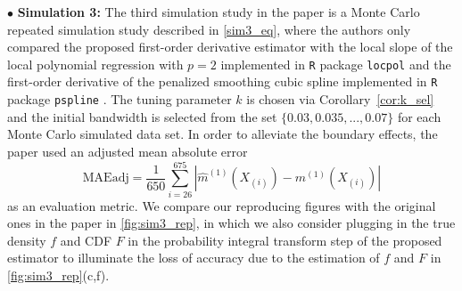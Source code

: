 \documentclass{uwstat572}
\theoremstyle{definition}
\renewcommand{\hat}{\widehat}
\theoremstyle{theorem}
\begin{document}
$\bullet$ {\bf Simulation 3:} The third simulation study in the paper \citep{liu2020smoothed} is a Monte Carlo repeated simulation study described in \eqref{sim3_eq}, where the authors only compared the proposed first-order derivative estimator with the local slope of the local polynomial regression with $p=2$ implemented in \texttt{R} package \texttt{locpol} \citep{locpol2022R} and the first-order derivative of the penalized smoothing cubic spline implemented in \texttt{R} package \texttt{pspline} \citep{pspline2022R}. The tuning parameter $k$ is chosen via Corollary~\ref{cor:k_sel} and the initial bandwidth is selected from the set $\{0.03, 0.035,...,0.07\}$ for each Monte Carlo simulated data set. In order to alleviate the boundary effects, the paper used an adjusted mean absolute error 
$$\text{MAEadj}=\frac{1}{650}\sum_{i=26}^{675} \left|\hat{m}^{(1)}(X_{(i)}) -m^{(1)}(X_{(i)}) \right|$$
as an evaluation metric. We compare our reproducing figures with the original ones in the paper in \autoref{fig:sim3_rep}, in which we also consider plugging in the true density $f$ and CDF $F$ in the probability integral transform step of the proposed estimator to illuminate the loss of accuracy due to the estimation of $f$ and $F$ in \autoref{fig:sim3_rep}(c,f).
\end{document}
